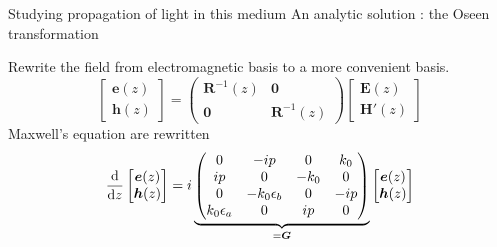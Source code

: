 \documentclass[aspectratio=169]{beamer}
\begin{document}
\begin{frame}{Studying propagation of light in this medium}
An analytic solution : the Oseen transformation


Rewrite the field from electromagnetic basis to a more convenient basis.
\begin{equation*}
\begin{bmatrix}
\bm{e}(z)\\\bm{h}(z)
\end{bmatrix} = \begin{pmatrix}
\bm{R}^{-1}(z) & \bm{0}\\
\bm{0} & \bm{R}^{-1}(z)
\end{pmatrix}\begin{bmatrix}
\bm{E}(z)\\\bm{H}'(z)
\end{bmatrix}
\end{equation*}
Maxwell's equation are rewritten
\begin{equation*}
\dv{z}\begin{bmatrix}
\bm{e}(z)\\\bm{h}(z)
\end{bmatrix}=i\underbrace{\begin{pmatrix}
	0 & -ip & 0 & k_0\\
	ip & 0 & -k_0 & 0\\
	0 & -k_0\epsilon_b & 0 & -ip\\
	k_0\epsilon_a & 0 & ip & 0\\
	\end{pmatrix}}_{=\bm{G}}\begin{bmatrix}
\bm{e}(z)\\\bm{h}(z)
\end{bmatrix}
\end{equation*}
\end{frame}
\end{document}

